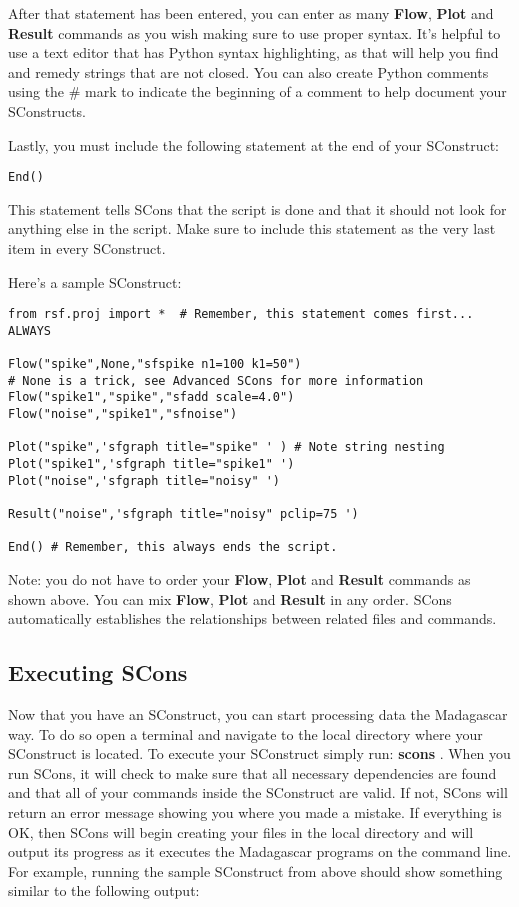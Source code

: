 After that statement has been entered, you can enter as many \textbf{Flow}, \textbf{Plot} and \textbf{Result} commands as you wish making sure to use proper syntax.  It's helpful to use a text editor that has Python syntax highlighting, as that will help you find and remedy strings that are not closed.  You can also create Python comments using the $\#$ mark to indicate the beginning of a comment to help document your SConstructs.

Lastly, you must include the following statement at the end of your SConstruct:
\begin{verbatim}
End()
\end{verbatim}
This statement tells SCons that the script is done and that it should not look for anything else in the script.  Make sure to include this statement as the very last item in every SConstruct. %

Here's a sample SConstruct:
\lstset{language=python,showstringspaces=false}
\begin{lstlisting}
from rsf.proj import *  # Remember, this statement comes first... ALWAYS

Flow("spike",None,"sfspike n1=100 k1=50") 
# None is a trick, see Advanced SCons for more information
Flow("spike1","spike","sfadd scale=4.0")
Flow("noise","spike1","sfnoise")

Plot("spike",'sfgraph title="spike" ' ) # Note string nesting
Plot("spike1",'sfgraph title="spike1" ') 
Plot("noise",'sfgraph title="noisy" ')

Result("noise",'sfgraph title="noisy" pclip=75 ')

End() # Remember, this always ends the script.
\end{lstlisting}
Note: you do not have to order your \textbf{Flow}, \textbf{Plot} and \textbf{Result} commands as shown above.  You can mix \textbf{Flow}, \textbf{Plot} and \textbf{Result} in any order.  SCons automatically establishes the relationships between related files and commands.

\subsection{Executing SCons}

Now that you have an SConstruct, you can start processing data the Madagascar way.  To do so open a terminal and navigate to the local directory where your SConstruct is located.  To execute your SConstruct simply run: \textbf{scons} .  When you run SCons, it will check to make sure that all necessary dependencies are found and that all of your commands inside the SConstruct are valid.  If not, SCons will return an error message showing you where you made a mistake.  If everything is OK, then SCons will begin creating your files in the local directory and will output its progress as it executes the Madagascar programs on the command line.  For example, running the sample SConstruct from above should show something similar to the following output:

